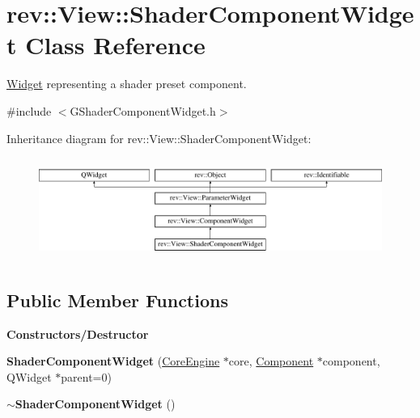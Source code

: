 \hypertarget{classrev_1_1_view_1_1_shader_component_widget}{}\section{rev\+::View\+::Shader\+Component\+Widget Class Reference}
\label{classrev_1_1_view_1_1_shader_component_widget}


\mbox{\hyperlink{class_widget}{Widget}} representing a shader preset component.  




{\ttfamily \#include $<$G\+Shader\+Component\+Widget.\+h$>$}

Inheritance diagram for rev\+::View\+::Shader\+Component\+Widget\+:\begin{figure}[H]
\begin{center}
\leavevmode
\includegraphics[height=3.378582cm]{classrev_1_1_view_1_1_shader_component_widget}
\end{center}
\end{figure}
\subsection*{Public Member Functions}
\begin{Indent}\textbf{ Constructors/\+Destructor}\par
\begin{DoxyCompactItemize}
\item 
\mbox{\label{classrev_1_1_view_1_1_shader_component_widget_aa9fb4425f8fda45e39f74200ede948af}} 
{\bfseries Shader\+Component\+Widget} (\mbox{\hyperlink{classrev_1_1_core_engine}{Core\+Engine}} $\ast$core, \mbox{\hyperlink{classrev_1_1_component}{Component}} $\ast$component, Q\+Widget $\ast$parent=0)
\item 
\mbox{\label{classrev_1_1_view_1_1_shader_component_widget_ae3ad1fb605e44931b089005d4dacf988}} 
{\bfseries $\sim$\+Shader\+Component\+Widget} ()
\end{DoxyCompactItemize}
\end{Indent}
